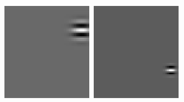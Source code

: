 \begin{figure}
\begin{center}
\includegraphics[width=\textwidth/9]{ch4/figures/Gabor1.png}
\includegraphics[width=\textwidth/9]{ch4/figures/Gabor2.png}

\end{center}
\end{figure}

